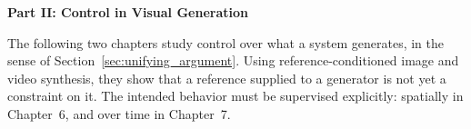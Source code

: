 
\cleardoublepage
{}
{}
\thispagestyle{plain}

\vspace*{\fill}
\begin{center}
{\Huge\bfseries Part II: Control in Visual Generation\par}
\vspace{1.5cm}
\begin{minipage}{0.8\textwidth}
\centering
The following two chapters study control over what a system generates, in the sense of Section~\ref{sec:unifying_argument}. Using reference-conditioned image and video synthesis, they show that a reference supplied to a generator is not yet a constraint on it. The intended behavior must be supervised explicitly: spatially in Chapter~6, and over time in Chapter~7.
\end{minipage}
\end{center}
\vspace*{\fill}

\clearpage
